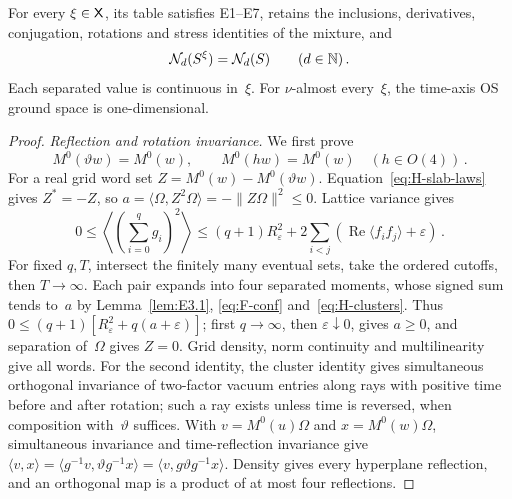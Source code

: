 \begin{lemma}\label{lem:H1.3}
For every $\xi\in\mathsf{X}$, its table satisfies E1--E7, retains the inclusions, derivatives, conjugation, rotations and stress identities of the mixture, and
\begin{equation*}
\mathcal{N}_{d}(S^\xi)=\mathcal{N}_{d}(S)\qquad(d\in\mathbb{N})\,.
\end{equation*}
Each separated value is continuous in~$\xi$. For $\nu$-almost every~$\xi$, the time-axis OS ground space is one-dimensional.
\end{lemma}
\begin{proof}
\emph{Reflection and rotation invariance.} We first prove
\begin{equation}\label{eq:H-reflection}
M^0(\vartheta w)=M^0(w),\qquad M^0(hw)=M^0(w)\quad(h\in O(4))\,.
\end{equation}
For a real grid word set $Z=M^0(w)-M^0(\vartheta w)$. Equation~\eqref{eq:H-slab-laws} gives $Z^*=-Z$, so $a=\langle\Omega,Z^2\Omega\rangle=-\|Z\Omega\|^2\le0$. Lattice variance gives
\begin{equation*}
0\le\left\langle\left(\sum_{i=0}^qg_i\right)^2\right\rangle
\le(q+1)R_\varepsilon^2+2\sum_{i<j}\left(\operatorname{Re}\langle f_if_j\rangle+\varepsilon\right)\,.
\end{equation*}
For fixed $q,T$, intersect the finitely many eventual sets, take the ordered cutoffs, then $T\to\infty$. Each pair expands into four separated moments, whose signed sum tends to~$a$ by Lemma~\ref{lem:E3.1}, \eqref{eq:F-conf} and~\eqref{eq:H-clusters}. Thus $0\le(q+1)[R_\varepsilon^2+q(a+\varepsilon)]$; first $q\to\infty$, then $\varepsilon\downarrow0$, gives $a\ge0$, and separation of~$\Omega$ gives $Z=0$. Grid density, norm continuity and multilinearity give all words. For the second identity, the cluster identity gives simultaneous orthogonal invariance of two-factor vacuum entries along rays with positive time before and after rotation; such a ray exists unless time is reversed, when composition with~$\vartheta$ suffices. With $v=M^0(u)\Omega$ and $x=M^0(w)\Omega$, simultaneous invariance and time-reflection invariance give $\langle v,x\rangle=\langle g^{-1}v,\vartheta g^{-1}x\rangle=\langle v,g\vartheta g^{-1}x\rangle$. Density gives every hyperplane reflection, and an orthogonal map is a product of at most four reflections.


\end{proof}
